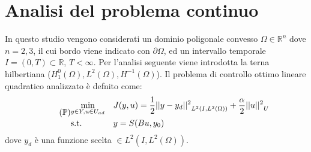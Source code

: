 \section{Analisi del problema continuo}
\label{chap:Continuos}

In questo studio vengono considerati un dominio poligonale convesso $\Omega \in \mathbb{R}^n$ dove $n=2,3$, il cui bordo viene indicato con $\partial\Omega$, ed un intervallo temporale $I = (0,T) \subset \mathbb{R}$, $T < \infty$. 
Per l'analisi seguente viene introdotta la terna hilbertiana (${H^{0}_{1}(\Omega)},{L^{2}(\Omega)},{H^{-1}(\Omega)}$).
Il problema di controllo ottimo lineare quadratico analizzato è defnito come:
{\renewcommand\arraystretch{2}
\begin{equation}
\tag{$\mathbb{P}$}
\begin{aligned}
& \underset{y \in Y, u \in U_{ad}}{\text{min}}
& & J(y,u) = \frac{1}{2}{||y-y_d||^{2}}_{L^2(I,{L^{2}(\Omega)})} + \frac{\alpha}{2}{||u||^{2}}_U \\
& \text{s.t.} & & y = S(Bu,y_0) \\
\label{eq:200}
\end{aligned}
\end{equation}
} %
dove $y_d$ è una funzione scelta $\in L^2(I,{L^{2}(\Omega)})$.

